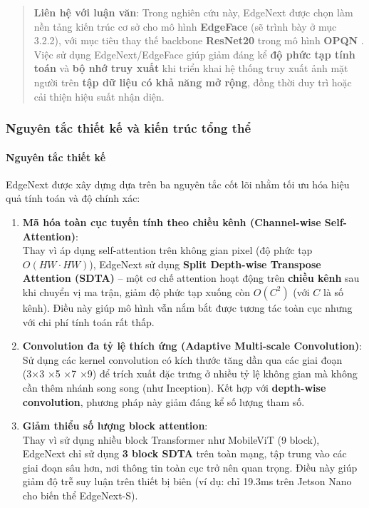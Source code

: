 \begin{quote}
\textbf{Liên hệ với luận văn}: Trong nghiên cứu này, EdgeNext được chọn làm nền tảng kiến trúc cơ sở cho mô hình \textbf{EdgeFace} (sẽ trình bày ở mục 3.2.2), với mục tiêu thay thế backbone \textbf{ResNet20} trong mô hình \textbf{OPQN} \cite{chen2021opqn}. Việc sử dụng EdgeNext/EdgeFace giúp giảm đáng kể \textbf{độ phức tạp tính toán} và \textbf{bộ nhớ truy xuất} khi triển khai hệ thống truy xuất ảnh mặt người trên \textbf{tập dữ liệu có khả năng mở rộng}, đồng thời duy trì hoặc cải thiện hiệu suất nhận diện.
\end{quote}

\subsubsection{Nguyên tắc thiết kế và kiến trúc tổng thể}

\paragraph{Nguyên tắc thiết kế}

EdgeNext được xây dựng dựa trên ba nguyên tắc cốt lõi nhằm tối ưu hóa hiệu quả tính toán và độ chính xác:

\begin{enumerate}
    \item \textbf{Mã hóa toàn cục tuyến tính theo chiều kênh (Channel-wise Self-Attention)}: \\
    Thay vì áp dụng self-attention trên không gian pixel (độ phức tạp $O(HW \cdot HW)$), EdgeNext sử dụng \textbf{Split Depth-wise Transpose Attention (SDTA)} -- một cơ chế attention hoạt động trên \textbf{chiều kênh} sau khi chuyển vị ma trận, giảm độ phức tạp xuống còn \textbf{$O(C^2)$} (với $C$ là số kênh). Điều này giúp mô hình vẫn nắm bắt được tương tác toàn cục nhưng với chi phí tính toán rất thấp.

    \item \textbf{Convolution đa tỷ lệ thích ứng (Adaptive Multi-scale Convolution)}: \\
    Sử dụng các kernel convolution có kích thước tăng dần qua các giai đoạn (3×3 ×5 ×7 ×9) để trích xuất đặc trưng ở nhiều tỷ lệ không gian mà không cần thêm nhánh song song (như Inception). Kết hợp với \textbf{depth-wise convolution}, phương pháp này giảm đáng kể số lượng tham số.

    \item \textbf{Giảm thiểu số lượng block attention}: \\
    Thay vì sử dụng nhiều block Transformer như MobileViT (9 block), EdgeNext chỉ sử dụng \textbf{3 block SDTA} trên toàn mạng, tập trung vào các giai đoạn sâu hơn, nơi thông tin toàn cục trở nên quan trọng. Điều này giúp giảm độ trễ suy luận trên thiết bị biên (ví dụ: chỉ 19.3ms trên Jetson Nano cho biến thể EdgeNext-S).
\end{enumerate}

